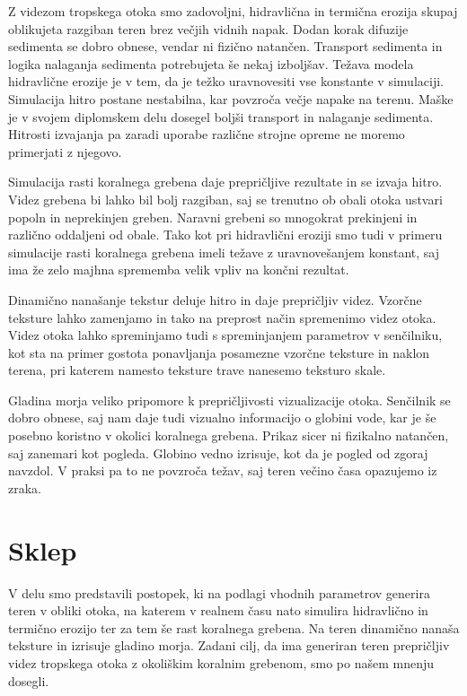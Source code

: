 \documentclass[9pt]{pnas-new}
\begin{document}
Z videzom tropskega otoka smo zadovoljni, hidravlična in termična erozija skupaj oblikujeta razgiban teren brez večjih vidnih napak. Dodan korak difuzije sedimenta se dobro obnese, vendar ni fizično natančen. Transport sedimenta in logika nalaganja sedimenta potrebujeta še nekaj izboljšav. Težava modela hidravlične erozije je v tem, da je težko uravnovesiti vse konstante v simulaciji. Simulacija hitro postane nestabilna, kar povzroča večje napake na terenu. Maške \cite{maske_2013} je v svojem diplomskem delu dosegel boljši transport in nalaganje sedimenta. Hitrosti izvajanja pa zaradi uporabe različne strojne opreme ne moremo primerjati z njegovo.

Simulacija rasti koralnega grebena daje prepričljive rezultate in se izvaja hitro. Videz grebena bi lahko bil bolj razgiban, saj se trenutno ob obali otoka ustvari popoln in neprekinjen greben. Naravni grebeni so mnogokrat prekinjeni in različno oddaljeni od obale. Tako kot pri hidravlični eroziji smo tudi v primeru simulacije rasti koralnega grebena imeli težave z uravnovešanjem konstant, saj ima že zelo majhna sprememba velik vpliv na končni rezultat.

Dinamično nanašanje tekstur deluje hitro in daje prepričljiv videz. Vzorčne teksture lahko zamenjamo in tako na preprost način spremenimo videz otoka. Videz otoka lahko spreminjamo tudi s spreminjanjem parametrov v senčilniku, kot sta na primer gostota ponavljanja posamezne vzorčne teksture in naklon terena, pri katerem namesto teksture trave nanesemo teksturo skale. 

Gladina morja veliko pripomore k prepričljivosti vizualizacije otoka. Senčilnik se dobro obnese, saj nam daje tudi vizualno informacijo o globini vode, kar je še posebno koristno v okolici koralnega grebena. Prikaz sicer ni fizikalno natančen, saj zanemari kot pogleda. Globino vedno izrisuje, kot da je pogled od zgoraj navzdol. V praksi pa to ne povzroča težav, saj teren večino časa opazujemo iz zraka.

\section*{Sklep}
V delu smo predstavili postopek, ki na podlagi vhodnih parametrov generira teren v obliki otoka, na katerem v realnem času nato simulira hidravlično in termično erozijo ter za tem še rast koralnega grebena. Na teren dinamično nanaša teksture in izrisuje gladino morja. Zadani cilj, da ima generiran teren prepričljiv videz tropskega otoka z okoliškim koralnim grebenom, smo po našem mnenju dosegli. 
\end{document}
